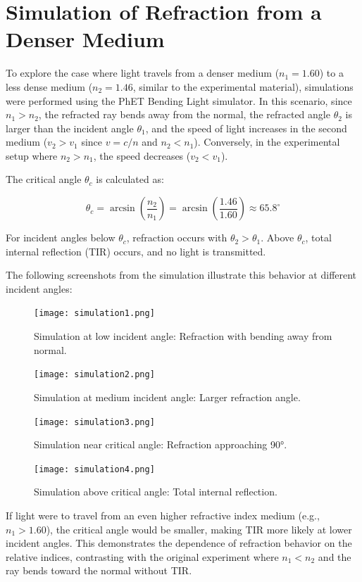 \documentclass[12pt, a4paper]{article}
\begin{document}
\section{Simulation of Refraction from a Denser Medium}
To explore the case where light travels from a denser medium ($n_1 = 1.60$) to a less dense medium ($n_2 = 1.46$, similar to the experimental material), simulations were performed using the PhET Bending Light simulator. In this scenario, since $n_1 > n_2$, the refracted ray bends away from the normal, the refracted angle $\theta_2$ is larger than the incident angle $\theta_1$, and the speed of light increases in the second medium ($v_2 > v_1$ since $v = c/n$ and $n_2 < n_1$). Conversely, in the experimental setup where $n_2 > n_1$, the speed decreases ($v_2 < v_1$).

The critical angle $\theta_c$ is calculated as:

\[ \theta_c = \arcsin\left(\frac{n_2}{n_1}\right) = \arcsin\left(\frac{1.46}{1.60}\right) \approx 65.8^\circ \]

For incident angles below $\theta_c$, refraction occurs with $\theta_2 > \theta_1$. Above $\theta_c$, total internal reflection (TIR) occurs, and no light is transmitted.

The following screenshots from the simulation illustrate this behavior at different incident angles:

\begin{figure}[H]
\centering
\texttt{[image: simulation1.png]}
\caption{Simulation at low incident angle: Refraction with bending away from normal.}
\label{fig:sim1}
\end{figure}

\begin{figure}[H]
\centering
\texttt{[image: simulation2.png]}
\caption{Simulation at medium incident angle: Larger refraction angle.}
\label{fig:sim2}
\end{figure}

\begin{figure}[H]
\centering
\texttt{[image: simulation3.png]}
\caption{Simulation near critical angle: Refraction approaching 90°.}
\label{fig:sim3}
\end{figure}

\begin{figure}[H]
\centering
\texttt{[image: simulation4.png]}
\caption{Simulation above critical angle: Total internal reflection.}
\label{fig:sim4}
\end{figure}

If light were to travel from an even higher refractive index medium (e.g., $n_1 > 1.60$), the critical angle would be smaller, making TIR more likely at lower incident angles. This demonstrates the dependence of refraction behavior on the relative indices, contrasting with the original experiment where $n_1 < n_2$ and the ray bends toward the normal without TIR.
\end{document}
